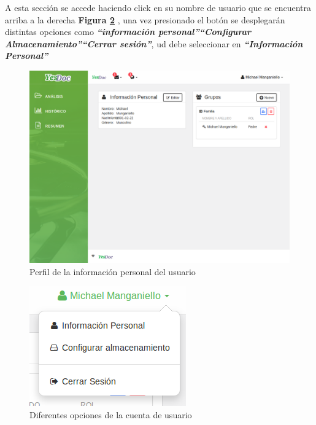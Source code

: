 \documentclass[a4paper,12pt]{article}
\begin{document}
A esta sección se accede haciendo click en su nombre de usuario que se encuentra arriba a la derecha \textbf{Figura \ref{mu-opcion_usuario} }, una vez presionado el botón se desplegarán distintas opciones como \textbf{\textit{``información personal''``Configurar Almacenamiento''``Cerrar sesión''}}, ud debe seleccionar en \textbf{\textit{``Información Personal''}}
  \begin{figure}
  	\centering
  	\includegraphics[width=.8\textwidth]{img/manual_de_usuario/informacion_personal}
  	\caption{Perfil de la información personal del usuario}
  	\label{mu-informacion_personal}
  \end{figure}
    \begin{figure}
    	\centering
    	\includegraphics[width=.5\textwidth]{img/manual_de_usuario/opcion_usuario}
    	\caption{Diferentes opciones de la cuenta de usuario                                                                                                                                                                                                                                                                                                                                                                                                                                                                                                  }
    	\label{mu-opcion_usuario}
    \end{figure}
    
\end{document}
